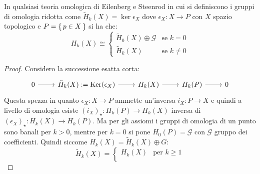 \begin{proposition}
  In qualsiasi teoria omologica di Eilenberg e Steenrod in cui si definiscono i
  gruppi di omologia ridotta come $ \tilde{H}_k(X) = \ker{\epsilon_X} $ dove
  $ \epsilon_X \colon X \to P $ con $ X $ spazio topologico e $ P = \set{p \in X} $ si ha che:
  \[
    H_k(X) \cong
    \begin{cases}
      \tilde{H}_0(X) \oplus \mathcal{G} & \text{se } k = 0 \\
      \tilde{H}_k(X) & \text{se } k \not= 0
    \end{cases}
  \]
\end{proposition}
\begin{proof}
  Considero la successione esatta corta:
  \[
    \begin{tikzcd}
      0 \rar & \tilde{H}_k(X) := \ker{\epsilon_X} \rar & H_k(X) \rar & H_k(P) \rar & 0
    \end{tikzcd}
  \]
  Questa spezza in quanto $ \epsilon_X \colon X \to P $ ammette un'inversa
  $ i_X \colon P \to X $ e quindi a livello di omologia esiste
  $ (i_X)_\star \colon H_k(P) \to H_k(X) $ inversa di
  $ (\epsilon_X)_\star \colon H_k(X) \to H_k(P) $. Ma per gli assiomi i gruppi
  di omologia di un punto sono banali per $ k > 0 $, mentre
  per $ k = 0 $ si pone $ H_0(P) = \mathcal{G} $ con $ \mathcal{G} $ gruppo dei coefficienti.
  Quindi siccome $ H_k(X) = \tilde{H}_k(X) \oplus G $:
  \[
    \tilde{H}_k(X) =
    \begin{cases}
      H_k(X)               & \text{per } k \geq 1 \\

\end{cases}\]
\end{proof}
